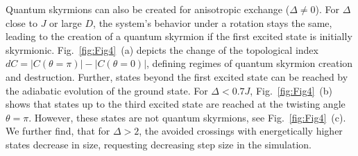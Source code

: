 \documentclass[reprint,aps,prb,superscriptaddress,10pt]{revtex4-2} %
\begin{document}
Quantum skyrmions can also be created for anisotropic exchange ($ \Delta\neq0$). For $\Delta$ close to $J$ or large $D$, the system's behavior under a rotation stays the same, leading to the creation of a quantum skyrmion if the first excited state is initially skyrmionic. Fig.~\ref{fig:Fig4}~(a) depicts the change of the topological index $dC = |C(\theta=\pi)| - |C(\theta=0)|$, defining regimes of quantum skyrmion creation and destruction.
Further, states beyond the first excited state can be reached by the adiabatic evolution of the ground state.
For $\Delta<0.7J$, Fig.~\ref{fig:Fig4}~(b) shows that states up to the third excited state are reached at the twisting angle $\theta=\pi$.
However, these states are not quantum skyrmions, see Fig.~\ref{fig:Fig4}~(c).
We further find, that for $\Delta>2$, the avoided crossings with energetically higher states decrease in size, requesting decreasing step size in the simulation.
\end{document}
